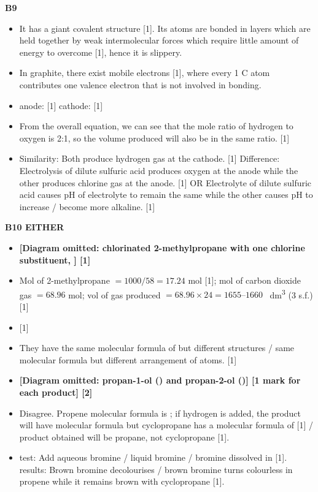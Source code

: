 \documentclass[11pt]{exam}
\begin{document}
\textbf{B9}
\begin{itemize}
\item[(a)] It has a giant covalent structure [1]. Its atoms are bonded in layers which are held together by weak intermolecular forces which require little amount of energy to overcome [1], hence it is slippery.

\item[(b)(i)] In graphite, there exist mobile electrons [1], where every 1 C atom contributes one valence electron that is not involved in bonding.

\item[(b)(ii)] anode:  [1] \hfill cathode:  [1]

\item[(b)(iii)] From the overall equation, we can see that the mole ratio of hydrogen to oxygen is 2:1, so the volume produced will also be in the same ratio. [1]

\item[(b)(iv)] Similarity: Both produce hydrogen gas at the cathode. [1] \hfill Difference: Electrolysis of dilute sulfuric acid produces oxygen at the anode while the other produces chlorine gas at the anode. [1] OR Electrolyte of dilute sulfuric acid causes pH of electrolyte to remain the same while the other causes pH to increase / become more alkaline. [1]
\end{itemize}

\textbf{B10 EITHER}
\begin{itemize}
\item[(a)(i)] \textbf{[Diagram omitted: chlorinated 2-methylpropane with one chlorine substituent, ] [1]}

\item[(a)(ii)] Mol of 2-methylpropane $= 1000/58 = 17.24$ mol [1]; mol of carbon dioxide gas $= 68.96$ mol; vol of gas produced $= 68.96 \times 24 = 1655\text{--}1660$ \qty{}{\dm\cubed} (3 s.f.) [1]

\item[(a)(iii)]  [1]

\item[(b)(i)] They have the same molecular formula of  but different structures / same molecular formula but different arrangement of atoms. [1]

\item[(b)(ii)] \textbf{[Diagram omitted: propan-1-ol () and propan-2-ol ()] \hfill [1 mark for each product] [2]}

\item[(b)(iii)] Disagree. Propene molecular formula is ; if hydrogen is added, the product will have molecular formula  but cyclopropane has a molecular formula of  [1] / product obtained will be propane, not cyclopropane [1].

\item[(b)(iv)] test: Add aqueous bromine / liquid bromine / bromine dissolved in  [1]. results: Brown bromine decolourises / brown bromine turns colourless in propene while it remains brown with cyclopropane [1].
\end{itemize}
\end{document}
